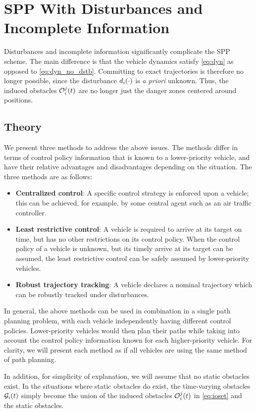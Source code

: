 \section{SPP With Disturbances and Incomplete Information \label{sec:incomp}}
Disturbances and incomplete information significantly complicate the SPP scheme. The main difference is that the vehicle dynamics satisfy \eqref{eq:dyn} as opposed to \eqref{eq:dyn_no_dstb}. Committing to exact trajectories is therefore no longer possible, since the disturbance $d_i(\cdot)$ is \textit{a priori} unknown. Thus, the induced obstacles $\mathcal{O}_i^j(t)$ are no longer just the danger zones centered around positions. 

\subsection{Theory}
We present three methods to address the above issues. The methods differ in terms of control policy information that is known to a lower-priority vehicle, and have their relative advantages and disadvantages depending on the situation. The three methods are as follows:
\begin{itemize}
\item \textbf{Centralized control}: A specific control strategy is enforced upon a vehicle; this can be achieved, for example, by some central agent such as an air traffic controller.
\item \textbf{Least restrictive control}: A vehicle is required to arrive at its target on time, but has no other restrictions on its control policy. When the control policy of a vehicle is unknown, but its timely arrive at its target can be assumed, the least restrictive control can be safely assumed by lower-priority vehicles.
\item \textbf{Robust trajectory tracking}: A vehicle declares a nominal trajectory which can be robustly tracked under disturbances.
\end{itemize}

In general, the above methods can be used in combination in a single path planning problem, with each vehicle independently having different control policies. Lower-priority vehicles would then plan their paths while taking into account the control policy information known for each higher-priority vehicle. For clarity, we will present each method as if all vehicles are using the same method of path planning.

In addition, for simplicity of explanation, we will assume that no static obstacles exist. In the situations where static obstacles do exist, the time-varying obstacles $\mathcal{G}_i(t)$ simply become the union of the induced obstacles $\mathcal{O}_i^j(t)$ in \eqref{eq:ioset} and the static obstacles.

